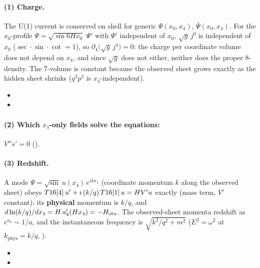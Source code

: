 \paragraph{(1) Charge.} The U(1) current is conserved on shell for generic $\Psi(x_0,x_4)$,
$\bar\Psi(x_0,x_4)$. For the $x_0$-profile $\Psi=\sqrt{\sin 6Hx_0}\;\Psi'$ with $\Psi'$ independent of
$x_0$, $\sqrt g\,j^0$ is independent of $x_0$ ($\sec\cdot\sin\cdot\cot=1$), so
$\partial_4\bigl(\sqrt g\,j^4\bigr)=0$: the charge per coordinate volume does not depend on $x_4$, and
since $\sqrt g$ does not either, neither does the proper 8-density. The 7-volume is constant because
the observed sheet grows exactly as the hidden sheet shrinks ($q^3p^3$ is $x_4$-independent).
\begin{itemize}
  \item {}
  \item {}
\end{itemize}

\paragraph{(2) Which $x_4$-only fields solve the equations:} $V''s'=0$ ().

\paragraph{(3) Redshift.} A mode $\Psi=\sqrt{\sin}\;u(x_4)\,e^{ikx_1}$ (coordinate momentum $k$ along
the observed sheet) obeys $T16[4]\,u'+i\,(k/q)\,T16[1]\,u=HV'u$ exactly (mass term, $V'$
constant): its \textbf{physical} momentum is $k/q$, and $d\ln(k/q)/dx_4=H\,a_4'(Hx_4)=-H_{\mathrm{obs}}$. The
observed-sheet momenta redshift as $e^{a_4}\sim1/a$, and the instantaneous frequency is
$\sqrt{k^2/q^2+m^2}$ ($E^2=\omega^2$ at $k_{\mathrm{phys}}=k/q$, ). 
\begin{itemize}
  \item {}
  \item {}
\end{itemize}

